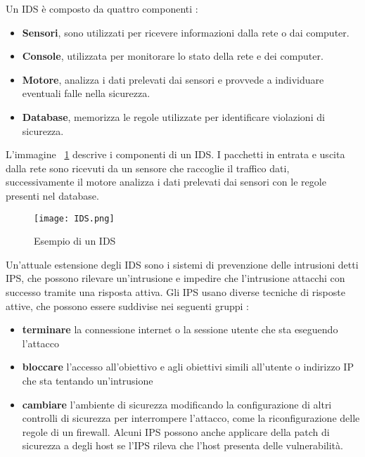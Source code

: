 \documentclass[../main.tex]{subfiles}
\begin{document}
Un IDS è composto da quattro componenti \cite{idsbook}:

\begin{itemize}
				\item \textbf{Sensori}, sono utilizzati per ricevere informazioni dalla rete o dai computer.

				\item \textbf{Console}, utilizzata per monitorare lo stato della rete e dei computer.

				\item \textbf{Motore}, analizza i dati prelevati dai sensori e provvede a individuare eventuali falle nella sicurezza.

				\item \textbf{Database}, memorizza le regole utilizzate per identificare violazioni di sicurezza.
\end{itemize}

L'immagine ~\ref{fig:esempioIds} descrive i componenti di un IDS. I pacchetti in entrata e uscita dalla rete sono ricevuti da un sensore che raccoglie il traffico dati, successivamente il motore analizza i dati prelevati dai sensori con le regole presenti nel database.

\begin{figure}[H]
				\centering
				\texttt{[image: IDS.png]}
				\caption{Esempio di un IDS}
				\label{fig:esempioIds}
\end{figure}

Un'attuale estensione degli IDS sono i sistemi di prevenzione delle intrusioni detti IPS, che possono rilevare un'intrusione e impedire che l'intrusione attacchi con successo tramite una risposta attiva. Gli IPS usano diverse tecniche di risposte attive, che possono essere suddivise nei seguenti gruppi \cite{IPS}:

\begin{itemize}
				\item \textbf{terminare} la connessione internet o la sessione utente che sta eseguendo l'attacco
				\item \textbf{bloccare} l'accesso all'obiettivo e agli obiettivi simili all'utente o indirizzo IP che sta tentando un'intrusione
				\item \textbf{cambiare} l'ambiente di sicurezza modificando la configurazione di altri controlli di sicurezza per interrompere l'attacco, come la riconfigurazione delle regole di un firewall. Alcuni IPS possono anche applicare della patch di sicurezza a degli host se l'IPS rileva che l'host presenta delle vulnerabilità.
\end{itemize}
\end{document}
